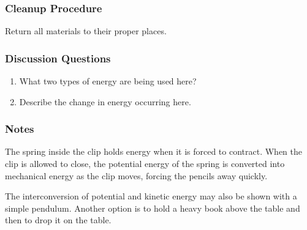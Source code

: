 \subsubsection*{Cleanup Procedure}
Return all materials to their proper places.

\subsubsection*{Discussion Questions}
\begin{enumerate}
\item{What two types of energy are being used here?}
\item{Describe the change in energy occurring here.}
\end{enumerate}
 
\subsubsection{Notes}
The spring inside the clip holds energy when it is forced to contract.  
When the clip is allowed to close, the potential energy of the spring
is converted into mechanical energy as the clip moves, forcing the pencils
away quickly.

The interconversion of potential and kinetic energy may also be shown with a simple pendulum. Another option is to hold a heavy book above the table and then to drop it on the table.


